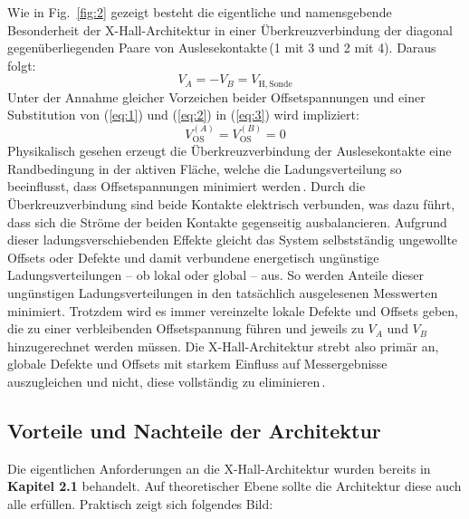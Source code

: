 \documentclass[12pt, a4paper]{article}
\begin{document}
Wie in Fig.~\ref{fig:2} gezeigt besteht die eigentliche und namensgebende Besonderheit der X-Hall-Architektur in einer Überkreuzverbindung der diagonal gegenüberliegenden Paare von Auslesekontakte\,(1 mit 3 und 2 mit 4). Daraus folgt:
\begin{equation}
	V_A=-V_B=V_\mathrm{H,Sonde}
	\label{eq:3}
\end{equation}
Unter der Annahme gleicher Vorzeichen beider Offsetspannungen und einer Substitution von (\ref{eq:1}) und (\ref{eq:2}) in (\ref{eq:3}) wird  impliziert:
\begin{equation}
	V_\mathrm{OS}^{(A)}=V_\mathrm{OS}^{(B)}=0
	\label{eq:4}
\end{equation}
Physikalisch gesehen erzeugt die Überkreuzverbindung der Auslesekontakte eine  Randbedingung in der aktiven Fläche, welche die Ladungsverteilung so beeinflusst, dass Offsetspannungen minimiert werden\,\cite{cres21}. 
Durch die Überkreuzverbindung sind beide Kontakte elektrisch verbunden, was dazu führt, dass sich die Ströme der beiden Kontakte gegenseitig ausbalancieren. %
Aufgrund dieser ladungsverschiebenden Effekte gleicht das System selbstständig ungewollte Offsets oder Defekte und damit verbundene energetisch ungünstige Ladungsverteilungen – ob lokal oder global – aus. %
So werden Anteile dieser ungünstigen Ladungsverteilungen in den tatsächlich ausgelesenen Messwerten minimiert.\newline
Trotzdem wird es immer vereinzelte lokale Defekte und Offsets geben, die zu einer verbleibenden Offsetspannung führen und jeweils zu $V_A$ und $V_B$ hinzugerechnet werden müssen. Die X-Hall-Architektur strebt also primär an, globale Defekte und Offsets mit starkem Einfluss auf Messergebnisse auszugleichen und nicht, diese vollständig zu eliminieren\,\cite{cres21}.

\subsection{Vorteile und Nachteile der Architektur}
Die eigentlichen Anforderungen an die X-Hall-Architektur wurden bereits in \textbf{Kapitel 2.1} behandelt. Auf theoretischer Ebene sollte die Architektur diese auch alle erfüllen.\newline
Praktisch zeigt sich folgendes Bild:\paragraph{}
\end{document}
